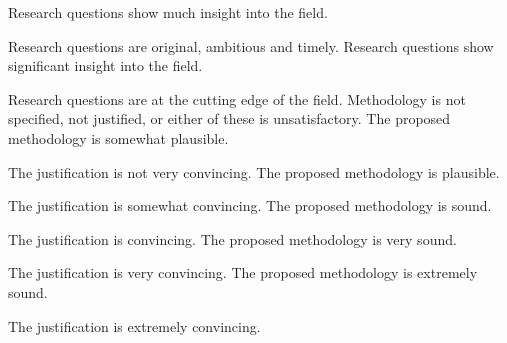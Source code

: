 \begin{markingrubric}
        \grade 		Research questions show much insight into the field.
        \par		Research questions are original, ambitious and timely.
        \grade 		Research questions show significant insight into the field.
        \par		Research questions are at the cutting edge of the field.
        \grade\fail 	Methodology is not specified, not justified, or either of these is unsatisfactory.
        \grade 		The proposed methodology is somewhat plausible.
        \par		The justification is not very convincing.
        \grade 		The proposed methodology is plausible.
        \par		The justification is somewhat convincing.
        \grade 		The proposed methodology is sound.
        \par		The justification is convincing.
        \grade 		The proposed methodology is very sound.
        \par		The justification is very convincing.
        \grade 		The proposed methodology is extremely sound.
        \par		The justification is extremely convincing.
%
\end{markingrubric}
    
